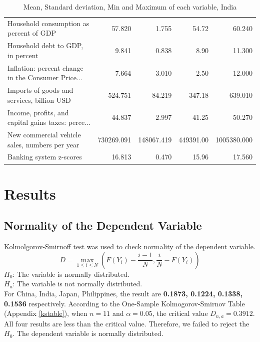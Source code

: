 \documentclass[11pt]{article}
\begin{document}
\begin{table}[H]
{\begin{tabular}{lrrrr}
Household consumption as percent of GDP            &      57.820 &       1.755 &      54.72 &       60.240 \\
Household debt to GDP, in percent                  &       9.841 &       0.838 &       8.90 &       11.300 \\
Inflation: percent change in the Consumer Price... &       7.664 &       3.010 &       2.50 &       12.000 \\
Imports of goods and services, billion USD         &     524.751 &      84.219 &     347.18 &      639.010 \\
Income, profits, and capital gains taxes: perce... &      44.837 &       2.997 &      41.25 &       50.270 \\
New commercial vehicle sales, numbers per year     &  730269.091 &  148067.419 &  449391.00 &  1005380.000 \\
Banking system z-scores                            &      16.813 &       0.470 &      15.96 &       17.560 \\
\bottomrule
\end{tabular}}
\caption{Mean, Standard deviation, Min and Maximum of each variable, India}
\label{tab:describe_ind}
\end{table}

\section{Results}\label{results}
\subsection{Normality of the Dependent Variable}\label{normality_check}
Kolmolgorov-Smirnoff test was used to check normality of the dependent variable.
$$D=\underset{1 \leq i \leq N}{\max}(F(Y_i)-\frac{i-1}{N},\frac{i}{N}-F(Y_i))$$
$H_0$: The variable is normally distributed.\\
$H_a$: The variable is not normally distributed.\\
For China, India, Japan, Philippines, the result are \textbf{0.1873, 0.1224, 0.1338, 0.1536} respectively. According to the One-Sample Kolmogorov-Smirnov Table (Appendix \ref{kstable}), when $n=11$ and $\alpha=0.05$, the critical value $D_{n,a}=0.3912$. All four results are less than the critical value. Therefore, we failed to reject the $H_0$. The dependent variable is normally distributed.
\end{document}
